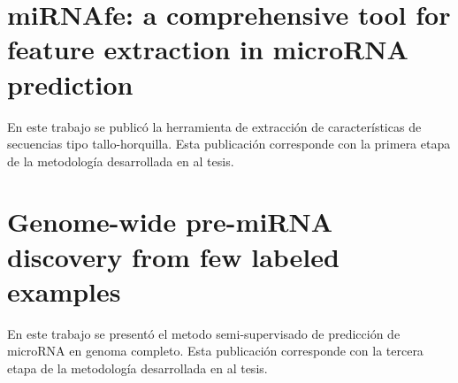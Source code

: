 \begin{appendices}
	\chapter{miRNAfe: a comprehensive tool for feature extraction in microRNA prediction}
	\label{sec:mirnafe}
	En este trabajo se publicó la herramienta de extracción de características de secuencias tipo tallo-horquilla. Esta publicación corresponde con la primera
	etapa de la metodología desarrollada en al tesis.
	
	

	\chapter{Genome-wide pre-miRNA discovery from few labeled examples}
	\label{sec:mirnass}
	En este trabajo se presentó el metodo semi-supervisado de predicción de microRNA en genoma completo. Esta publicación corresponde con la tercera etapa de
	la metodología desarrollada en al tesis.
	
	
\end{appendices}
